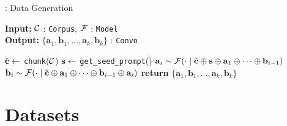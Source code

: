 
\begin{algorithm}
    \caption{\method: Data Generation}
    \textbf{Input:} $\mathcal{C}$ : \texttt{Corpus}, $\mathcal{F}$ : \texttt{Model}  \\
    \textbf{Output:} $\{\mathbf{a}_1, \mathbf{b}_1, \dots, \mathbf{a}_k, \mathbf{b}_k\}$ :  \texttt{Convo}
    \begin{algorithmic}[1]
    \label{alg:synthetic-generation}
    \State $\tilde{\mathbf{c}} \gets$ \texttt{chunk}($\mathcal{C}$)  
    \State $\mathbf{s} \gets$ \texttt{get\_seed\_prompt}()  
     
        \State $\mathbf{a}_i \sim \mathcal{F}( \cdot \mid \tilde{\mathbf{c}} \oplus \mathbf{s} \oplus \mathbf{a}_{1} \oplus \dots \oplus \mathbf{b}_{i-1})$  
        \State $\mathbf{b}_i \sim \mathcal{F}( \cdot \mid \tilde{\mathbf{c}} \oplus \mathbf{a}_{1} \oplus \dots \oplus \mathbf{b}_{i-1} \oplus \mathbf{a}_{i})$  
    \EndFor
    \State \textbf{return} $ \{\mathbf{a}_1, \mathbf{b}_1, \dots, \mathbf{a}_k, \mathbf{b}_k\}$
    \end{algorithmic}
    \end{algorithm}



\section{Datasets}
\label{app:datasets}
